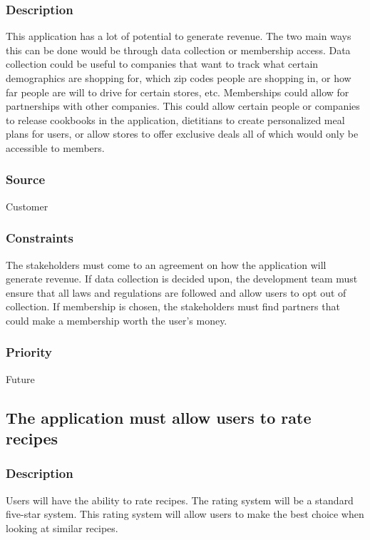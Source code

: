 \subsubsection{Description}
This application has a lot of potential to generate revenue. The two main ways this can be done would be through data collection or membership access. Data collection could be useful to companies that want to track what certain demographics are shopping for, which zip codes people are shopping in, or how far people are will to drive for certain stores, etc. Memberships could allow for partnerships with other companies. This could allow certain people or companies to release cookbooks in the application, dietitians to create personalized meal plans for users, or allow stores to offer exclusive deals all of which would only be accessible to members.
\subsubsection{Source}
Customer
\subsubsection{Constraints}
The stakeholders must come to an agreement on how the application will generate revenue. If data collection is decided upon, the development team must ensure that all laws and regulations are followed and allow users to opt out of collection. If membership is chosen, the stakeholders must find partners that could make a membership worth the user's money.
\subsubsection{Priority}
Future

\subsection{The application must allow users to rate recipes}
\subsubsection{Description}
Users will have the ability to rate recipes. The rating system will be a standard five-star system. This rating system will allow users to make the best choice when looking at similar recipes.
